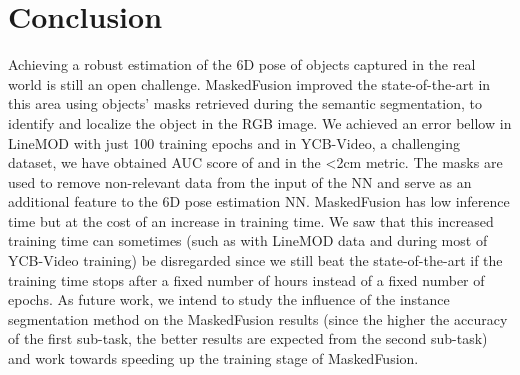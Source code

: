 \documentclass[runningheads]{llncs}
\begin{document}
\section{Conclusion}
Achieving a robust estimation of the 6D pose of objects captured in the real world is still an open challenge.
MaskedFusion improved the state-of-the-art in this area using objects' masks retrieved during the semantic segmentation, to identify and localize the object in the RGB image.
We achieved an error bellow  in LineMOD with just 100 training epochs and in YCB-Video, a challenging dataset, we have obtained AUC score of  and  in the \textless{}2cm metric.
The masks are used to remove non-relevant data from the input of the NN and serve as an additional feature to the 6D pose estimation NN.
MaskedFusion has low inference time but at the cost of an increase in training time.
We saw that this increased training time can sometimes (such as with LineMOD data and during most of YCB-Video training) be disregarded since we still beat the state-of-the-art if the training time stops after a fixed number of hours instead of a fixed number of epochs.
As future work, we intend to study the influence of the instance segmentation method on the MaskedFusion results (since the higher the accuracy of the first sub-task, the better results are expected from the second sub-task) and work towards speeding up the training stage of MaskedFusion.





\end{document}
